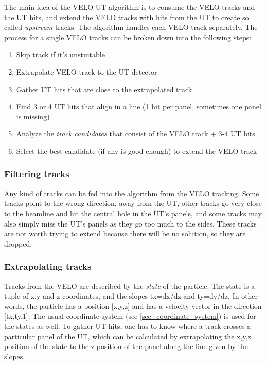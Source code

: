\documentclass[12pt]{article}
\begin{document}
The main idea of the VELO-UT algorithm is to consume the VELO tracks and the UT hits, and extend the VELO tracks with hits from the UT to create so called \textit{upstream} tracks. The algorithm handles each VELO track separately. The process for a single VELO tracks can be broken down into the following steps:

\begin{enumerate}
	\item Skip track if it's unstuitable
	\item Extrapolate VELO track to the UT detector
	\item Gather UT hits that are close to the extrapolated track
	\item Find 3 or 4 UT hits that align in a line (1 hit per panel, sometimes one panel is missing)
	\item Analyze the \textit{track candidates} that consist of the VELO track + 3-4 UT hits
	\item Select the best candidate (if any is good enough) to extend the VELO track
\end{enumerate}


\subsubsection{Filtering tracks}

Any kind of tracks can be fed into the algorithm from the VELO tracking. Some tracks point to the wrong direction, away from the UT, other tracks go very close to the beamline and hit the central hole in the UT's panels, and some tracks may also simply miss the UT's panels as they go too much to the sides. These tracks are not worth trying to extend because there will be no solution, so they are dropped.


\subsubsection{Extrapolating tracks}

Tracks from the VELO are described by the \textit{state} of the particle. The state is a tuple of x,y and z coordinates, and the slopes tx=dx/dz and ty=dy/dz. In other words, the particle has a position [x,y,z] and has a velocity vector in the direction [tx,ty,1]. The usual coordinate system (see \ref{sec_coordinate_system}) is used for the states as well. To gather UT hits, one has to know where a track crosses a particular panel of the UT, which can be calculated by extrapolating the x,y,z position of the state to the z position of the panel along the line given by the slopes.
\end{document}
